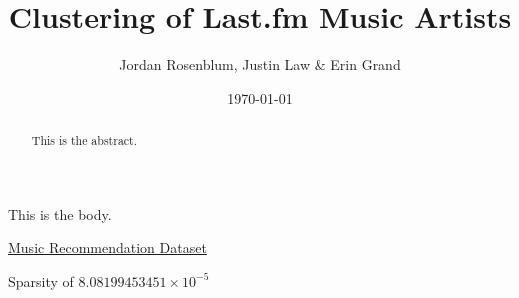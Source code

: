 \documentclass[12pt,preprint]{aastex}
\begin{document}
\title{Clustering of Last.fm Music Artists}

 \author{Jordan Rosenblum, Justin Law \& Erin Grand}
 
\date{\today}             

\begin{abstract}
This is the abstract. 
\end{abstract}


This is the body. 

\href{http://www.dtic.upf.edu/~ocelma/MusicRecommendationDataset/}{Music Recommendation Dataset}

Sparsity of $8.08199453451\times 10^{-5}$
\end{document}
